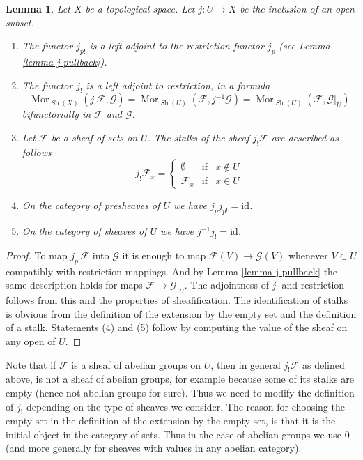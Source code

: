 \documentclass{stacks-project}
\theoremstyle{plain}
\newtheorem{lemma}[subsection]{Lemma}
\theoremstyle{definition}
\theoremstyle{remark}
\numberwithin{equation}{subsection}
\def\Mor{\mathop{\mathrm{Mor}}\nolimits}
\def\Sh{\mathop{\mathit{Sh}}\nolimits}
\begin{document}
\begin{lemma}
\label{lemma-j-shriek}
Let $X$ be a topological space.
Let $j : U \to X$ be the inclusion of an open subset.
\begin{enumerate}
\item The functor $j_{p!}$ is a left adjoint to the
restriction functor $j_p$ (see Lemma \ref{lemma-j-pullback}).
\item The functor $j_!$ is a left adjoint to restriction,
in a formula
$$
\Mor_{\Sh(X)}(j_!\mathcal{F}, \mathcal{G})
=
\Mor_{\Sh(U)}(\mathcal{F}, j^{-1}\mathcal{G})
=
\Mor_{\Sh(U)}(\mathcal{F}, \mathcal{G}|_U)
$$
bifunctorially in $\mathcal{F}$ and $\mathcal{G}$.
\item Let $\mathcal{F}$ be a sheaf of sets on $U$.
The stalks of the sheaf $j_!\mathcal{F}$ are described
as follows
$$
j_{!}\mathcal{F}_x =
\left\{
\begin{matrix}
\emptyset & \text{if} & x \not \in U \\
\mathcal{F}_x & \text{if} & x \in U
\end{matrix}
\right.
$$
\item On the category of presheaves of $U$ we have $j_pj_{p!} = \text{id}$.
\item On the category of sheaves of $U$ we have $j^{-1}j_! = \text{id}$.
\end{enumerate}
\end{lemma}

\begin{proof}
To map $j_{p!}\mathcal{F}$ into $\mathcal{G}$
it is enough to map $\mathcal{F}(V) \to \mathcal{G}(V)$
whenever $V \subset U$ compatibly with restriction
mappings. And by Lemma \ref{lemma-j-pullback}
the same description holds for maps
$\mathcal{F} \to \mathcal{G}|_U$.
The adjointness of $j_!$ and restriction follows
from this and the properties of sheafification.
The identification of stalks is obvious from the
definition of the extension by the empty set
and the definition of a stalk.
Statements (4) and (5) follow by computing the
value of the sheaf on any open of $U$.
\end{proof}

\noindent
Note that if $\mathcal{F}$ is a sheaf
of abelian groups on $U$, then in general $j_!\mathcal{F}$ as
defined above, is not a sheaf of abelian groups, for example
because some of its stalks are empty (hence not abelian groups
for sure). Thus we need to modify the definition of
$j_!$ depending on the type of sheaves we consider.
The reason for choosing the empty set in the definition of the
extension by the empty set, is that it is the initial object
in the category of sets. Thus in the case of abelian groups
we use $0$ (and more generally for sheaves with values in
any abelian category).
\end{document}
